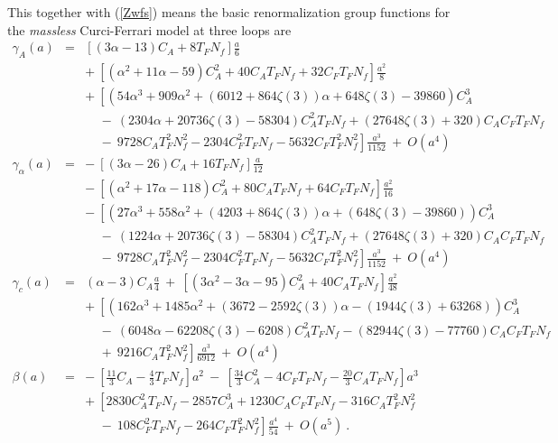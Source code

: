 \documentclass[a4paper,11pt]{article}
\newcommand{\Nf}{N_{\!f}}
\begin{document}
This together with (\ref{Zwfs}) means the basic renormalization group functions
for the {\em massless} Curci-Ferrari model at three loops are 
\begin{eqnarray} 
\gamma_A(a) &=& \left[ ( 3\alpha - 13 ) C_A + 8T_F \Nf \right] \frac{a}{6} 
\nonumber \\
&& +~ \left[ \left( \alpha^2 + 11\alpha - 59 \right) C_A^2 + 40 C_A T_F \Nf 
+ 32 C_F T_F \Nf \right] \frac{a^2}{8} \nonumber \\  
&& +~ \left[ \left( 54\alpha^3 + 909\alpha^2 + ( 6012 + 864\zeta(3) )\alpha 
+ 648\zeta(3) - 39860 \right) C_A^3 \right. \nonumber \\ 
&& \left. ~~~~~-~ \left( 2304\alpha + 20736\zeta(3) - 58304 \right) 
C_A^2 T_F \Nf + \left( 27648\zeta(3) + 320 \right) C_A C_F T_F \Nf \right. 
\nonumber \\ 
&& \left. ~~~~~-~ 9728 C_A T_F^2 \Nf^2 - 2304 C_F^2 T_F \Nf 
- 5632 C_F T_F^2 \Nf^2 \right] \frac{a^3}{1152} ~+~ O(a^4) \nonumber \\  
\gamma_\alpha(a) &=& -~ \left[ ( 3\alpha - 26 ) C_A + 16 T_F \Nf \right]
\frac{a}{12} \nonumber \\
&& -~ \left[ \left( \alpha^2 + 17\alpha - 118 \right) C_A^2 + 80 C_A T_F \Nf 
+ 64 C_F T_F \Nf \right] \frac{a^2}{16} \nonumber \\ 
&& -~ \left[ \left( 27\alpha^3 + 558\alpha^2 + ( 4203 + 864\zeta(3) )\alpha 
+ ( 648\zeta(3) - 39860 ) \right) C_A^3 \right. \nonumber \\ 
&& \left. ~~~~~-~ \left( 1224\alpha + 20736\zeta(3) - 58304 \right) 
C_A^2 T_F \Nf + \left( 27648\zeta(3) + 320 \right) C_A C_F T_F \Nf \right. 
\nonumber \\ 
&& \left. ~~~~~-~ 9728 C_A T_F^2 \Nf^2 - 2304 C_F^2 T_F \Nf 
- 5632 C_F T_F^2 \Nf^2 \right] \frac{a^3}{1152} ~+~ O(a^4) \nonumber \\  
\gamma_c(a) &=& ( \alpha - 3 ) C_A \frac{a}{4} ~+~ \left[ \left( 3\alpha^2 
- 3\alpha - 95 \right) C_A^2 + 40 C_A T_F \Nf \right] \frac{a^2}{48} 
\nonumber \\  
&& +~ \left[ \left( 162\alpha^3 + 1485\alpha^2 + ( 3672 - 2592\zeta(3) )\alpha 
- ( 1944\zeta(3) + 63268 ) \right) C_A^3 \right. \nonumber \\ 
&& \left. ~~~~~-~ \left( 6048\alpha - 62208\zeta(3) - 6208 \right) 
C_A^2 T_F \Nf - \left( 82944\zeta(3) - 77760 \right) C_A C_F T_F \Nf \right. 
\nonumber \\ 
&& \left. ~~~~~+~ 9216 C_A T_F^2 \Nf^2 \right] \frac{a^3}{6912} ~+~ O(a^4) 
\nonumber \\  
\beta(a) &=& -~ \left[ \frac{11}{3} C_A - \frac{4}{3} T_F \Nf \right] a^2 ~-~ 
\left[ \frac{34}{3} C_A^2 - 4 C_F T_F \Nf - \frac{20}{3} C_A T_F \Nf \right]
a^3 \nonumber \\  
&& +~ \left[ 2830 C_A^2 T_F \Nf - 2857 C_A^3 + 1230 C_A C_F T_F \Nf 
- 316 C_A T_F^2 \Nf^2 \right. \nonumber \\ 
&& \left. ~~~~~-~ 108 C_F^2 T_F \Nf - 264 C_F T_F^2 \Nf^2 \right] 
\frac{a^4}{54} ~+~ O(a^5) ~.  
\label{cfrge} 
\end{eqnarray} 
\end{document}
